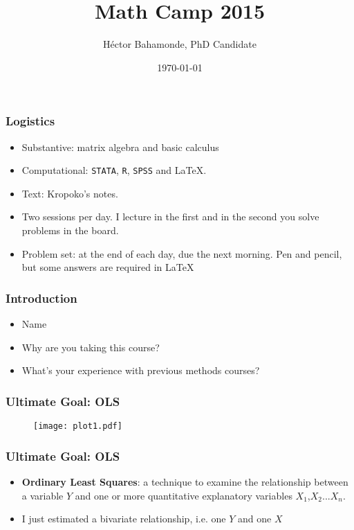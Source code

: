 \documentclass[compress]{beamer}
\title{Math Camp 2015}
\author{H\'ector Bahamonde, PhD Candidate}
\institute[Political Science]{Rutgers University}
\date{\today}
\begin{document}

\begin{frame}
\titlepage
\end{frame}

\begin{frame}\frametitle{Logistics}
\begin{itemize}
\item Substantive: matrix algebra and basic calculus\pause
\item Computational: \texttt{STATA}, \texttt{R}, \texttt{SPSS} and \LaTeX.\pause
\item Text: Kropoko's notes.\pause
\item Two sessions per day. I lecture in the first and in the second you solve problems in the board.\pause
\item Problem set: at the end of each day, due the next morning. Pen and pencil, but some answers are required in \LaTeX
\end{itemize}
\end{frame}

\begin{frame}\frametitle{Introduction}
\begin{itemize}
\item Name
\item Why are you taking this course?
\item What's your experience with previous methods courses?
\end{itemize}
\end{frame}



\begin{frame}\frametitle{Ultimate Goal: OLS}
\begin{figure}[H]
\centering\texttt{[image: plot1.pdf]}
\end{figure}
\end{frame}


\begin{frame}\frametitle{Ultimate Goal: OLS}
\begin{itemize}
\item {\bf Ordinary Least Squares}: a technique to examine the relationship between a variable $Y$ and one or more quantitative explanatory variables $X_{1}$,$X_{2}$...$X_{n}$.\pause
\item I just estimated a bivariate relationship, i.e. one $Y$ and one $X$
\end{itemize}
\end{frame}
\end{document}
